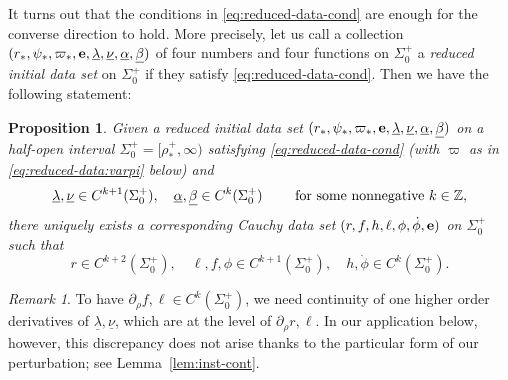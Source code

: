 \documentclass[10pt, reqno]{amsart}
\newtheorem{proposition}[theorem]{Proposition}
\theoremstyle{definition}
\theoremstyle{remark}
\newtheorem{remark}[theorem]{Remark}
\theoremstyle{conjecture}
\numberwithin{equation}{section}
\newcommand{\rd}{\partial}
\newcommand{\0}{\emptyset}
\newcommand{\alp}{\alpha}
\newcommand{\bt}{\beta}
\newcommand{\lmb}{\lambda}
\newcommand{\Sgm}{\Sigma}
\newcommand{\bfe}{{\bf e}}
\newcommand{\bbZ}{\mathbb Z}
\newcommand{\dur}{\nu}
\newcommand{\dvr}{\lmb}
\newcommand{\e}{\bfe}							%
\newcommand{\dvrd}{\underline{\dvr}}				%
\newcommand{\durd}{\underline{\dur}}				%
\newcommand{\alpd}{\underline{\alp}}				%
\newcommand{\btd}{\underline{\bt}}					%
\begin{document}
It turns out that the conditions in \eqref{eq:reduced-data-cond} are enough for the converse direction to hold. More precisely, let us call a collection $(r_{\ast}, \psi_{\ast}, \varpi_{\ast}, \e, \dvrd, \durd, \alpd, \btd)$ of four numbers and four functions on $\Sgm_{0}^{+}$ a \emph{reduced initial data set} on $\Sgm_{0}^{+}$ if they satisfy \eqref{eq:reduced-data-cond}. Then we have the following statement:
\begin{proposition} \label{prop:reduced-data}
Given a reduced initial data set $(r_{\ast}, \psi_{\ast}, \varpi_{\ast}, \e, \dvrd, \durd, \alpd, \btd)$ on a half-open interval $\Sgm_{0}^{+} = [\rho_{\ast}^{+}, \infty)$ satisfying \eqref{eq:reduced-data-cond} (with $\varpi$ as in \eqref{eq:reduced-data:varpi} below) and
\begin{equation*}
	\dvrd, \durd \in C^{k+1}(\Sgm_{0}^{+}), \quad
	\alpd, \btd \in C^{k}(\Sgm_{0}^{+}) \qquad \hbox{ for some nonnegative } k \in \bbZ,
\end{equation*}
there uniquely exists a corresponding Cauchy data set $(r, f, h, \ell, \phi, \dot{\phi}, \e)$ on $\Sgm_{0}^{+}$ such that
\begin{equation*}
	r \in C^{k+2}(\Sgm_{0}^{+}), \quad
	\ell, f, \phi \in C^{k+1}(\Sgm_{0}^{+}), \quad
	h, \dot{\phi} \in C^{k}(\Sgm_{0}^{+}).
\end{equation*}
\end{proposition}
\begin{remark} \label{rem:reduced-data}
To have $\rd_{\rho} f, \ell \in C^{k}(\Sgm_{0}^{+})$, we need continuity of one higher order derivatives of $\dvrd, \durd$, which are at the level of $\rd_{\rho} r, \ell$. In our application below, however, this discrepancy does not arise thanks to the particular form of our perturbation; see Lemma~\ref{lem:inst-cont}.
\end{remark}
\end{document}
